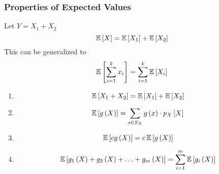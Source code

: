 		\subsubsection{Properties of Expected Values} \label{subsubsec:Properties of Discrete Expected Value}
			\begin{definition} \label{def:Linearity of Expectation}
				Let $Y = X_{1} + X_{2}$
				\begin{equation}
					\operatorname{\operatorname{\mathbb{E}}} \left[ X \right] = \operatorname{\operatorname{\mathbb{E}}} \left[ X_{1} \right] + \operatorname{\operatorname{\mathbb{E}}} \left[ X_{2} \right]
				\end{equation}
				This can be generalized to
				\begin{equation} \label{eq:General Linearity of Expectation}
					\operatorname{\operatorname{\mathbb{E}}} \left[ \sum_{i=1}^{k} x_{i} \right] = \sum_{i=1}^{k} \operatorname{\operatorname{\mathbb{E}}} \left[ X_{i} \right]
				\end{equation}
			\end{definition}
			\begin{enumerate}[label=\textbf{(\roman*)}, noitemsep, nolistsep]
				\item
					\begin{equation}
						\operatorname{\operatorname{\mathbb{E}}} \left[ X_{1} + X_{2} \right] = \operatorname{\operatorname{\mathbb{E}}} \left[ X_{1} \right] + \operatorname{\operatorname{\mathbb{E}}} \left[ X_{2} \right]
					\end{equation}
				\item
					\begin{equation}
						\operatorname{\operatorname{\mathbb{E}}} \left[ g \left( X \right) \right] = \sum\limits_{s \in S_{X}} g \left( x \right) \cdot p_{X} \left[ X \right]
					\end{equation}
				\item
					\begin{equation}
						\operatorname{\operatorname{\mathbb{E}}} \left[ c g\left( X \right) \right] = c \operatorname{\operatorname{\mathbb{E}}} \left[ g\left( X \right) \right]
					\end{equation}
				\item
					\begin{equation}
						\operatorname{\operatorname{\mathbb{E}}} \left[ g_{1} \left( X \right) + g_{2} \left( X \right) + \ldots + g_{m} \left( X \right) \right] = \sum\limits_{i=1}^{m} \operatorname{\operatorname{\mathbb{E}}} \left[ g_{i} \left( X \right) \right]
					\end{equation}
			\end{enumerate}
		
